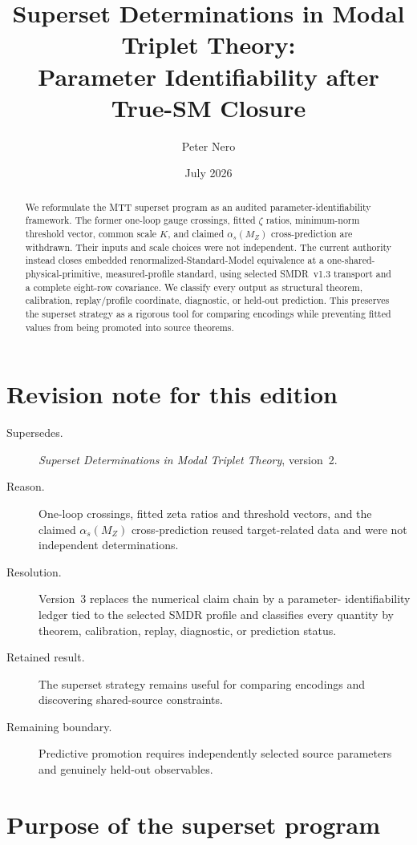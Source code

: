 \documentclass[11pt]{article}
\title{Superset Determinations in Modal Triplet Theory:\\Parameter Identifiability after True-SM Closure}
\author{Peter Nero}
\date{July 2026}
\begin{document}
\maketitle

\begin{abstract}
We reformulate the MTT superset program as an audited parameter-identifiability
framework. The former one-loop gauge crossings, fitted $\zeta$ ratios,
minimum-norm threshold vector, common scale $K$, and claimed
$\alpha_s(M_Z)$ cross-prediction are withdrawn. Their inputs and scale choices
were not independent. The current authority instead closes embedded
renormalized-Standard-Model equivalence at a one-shared-physical-primitive,
measured-profile standard, using selected SMDR~v1.3 transport and a complete
eight-row covariance. We classify every output as structural theorem,
calibration, replay/profile coordinate, diagnostic, or held-out prediction.
This preserves the superset strategy as a rigorous tool for comparing
encodings while preventing fitted values from being promoted into source
theorems.
\end{abstract}

\section*{Revision note for this edition}
\begin{description}
\item[Supersedes.] \emph{Superset Determinations in Modal Triplet Theory},
version~2.
\item[Reason.] One-loop crossings, fitted zeta ratios and threshold vectors,
and the claimed $\alpha_s(M_Z)$ cross-prediction reused target-related data and
were not independent determinations.
\item[Resolution.] Version~3 replaces the numerical claim chain by a parameter-
identifiability ledger tied to the selected SMDR profile and classifies every
quantity by theorem, calibration, replay, diagnostic, or prediction status.
\item[Retained result.] The superset strategy remains useful for comparing
encodings and discovering shared-source constraints.
\item[Remaining boundary.] Predictive promotion requires independently
selected source parameters and genuinely held-out observables.
\end{description}

\section{Purpose of the superset program}
\end{document}
